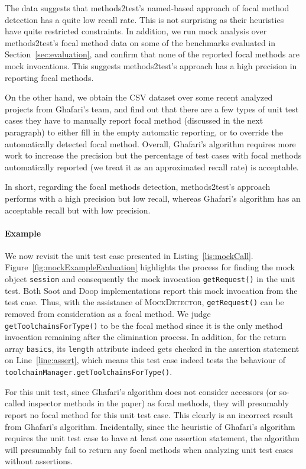 The data suggests that methods2test's named-based approach of focal method detection has a quite low recall rate. This is not surprising as their heuristics have quite restricted constraints. In addition, we run mock analysis over methods2test's focal method data on some of the benchmarks evaluated in Section~\ref{sec:evaluation}, and confirm that none of the reported focal methods are mock invocations. This suggests methods2test's approach has a high precision in reporting focal methods.

On the other hand, we obtain the CSV dataset over some recent analyzed projects from Ghafari's team, and find out that there are a few types of unit test cases they have to manually report focal method (discussed in the next paragraph) to either fill in the empty automatic reporting, or to override the automatically detected focal method. Overall, Ghafari's algorithm requires more work to increase the precision but the percentage of test cases with focal methods automatically reported (we treat it as an approximated recall rate) is acceptable. 

In short, regarding the focal methods detection, methods2test's approach performs with a high precision but low recall, whereas Ghafari's algorithm has an acceptable recall but with low precision.

\paragraph{Example} We now revisit the unit test case presented in Listing~\ref{lis:mockCall}. Figure~\ref{fig:mockExampleEvaluation} highlights the process for finding the mock object \texttt{session} and consequently the mock invocation \texttt{getRequest()} in the unit test. Both Soot and Doop implementations report this mock invocation 
from the test case. Thus, with the assistance of \textsc{MockDetector}, \texttt{getRequest()} can be removed from consideration as a focal method. We judge \texttt{getToolchainsForType()} to be the focal method since it is the only method invocation remaining after the elimination process. In addition, for the return array \texttt{basics}, its \texttt{length} attribute indeed gets checked in the assertion statement on Line~\ref{line:assert}, which means this test case indeed tests the behaviour of \texttt{toolchainManager.getToolchainsForType()}. 

For this unit test, since Ghafari's algorithm does not consider accessors (or so-called inspector methods in the paper) as focal methods, they will presumably report no focal method for this unit test case. This clearly is an incorrect result from Ghafari's algorithm.
Incidentally, since the heuristic of Ghafari's algorithm requires the unit test case to have at least one assertion statement, the algorithm will presumably fail to return any focal methods when analyzing unit test cases without assertions.

